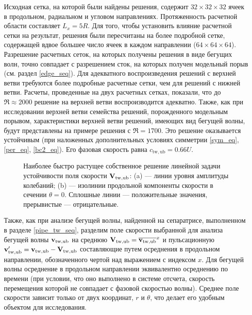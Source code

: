 Исходная сетка, на которой были найдены решения, содержит $32 \times 32 \times 32$ ячеек в продольном, радиальном и угловом направлениях. Протяженность расчетной области составляет $L_x = 5R$. Для того, чтобы установить влияние расчетной сетки на результат, решения были пересчитаны на более подробной сетке, содержащей вдвое большее число ячеек в каждом направлении ($64 \times 64 \times 64$). Разрешение расчетных сеток, на которых получены решения в виде бегущих волн, точно совпадает с разрешением сток, на которых получен модельный порыв (см. раздел \ref{edge_seq}). Для адекватного воспроизведения решений с верхней ветви требуются более подробные расчетные сетки, чем для решений с нижней ветви. Расчеты, проведенные на двух расчетных сетках, показали, что до $\Re \approx 2000$ решение на верхней ветви воспроизводится адекватно. Также, как при исследовании верхней ветви семейства решений, порожденного модельным порывом, характеристики верхней ветви решений, имеющих вид бегущей волны, будут представлены на примере решения с $\Re = 1700$. Это решение оказывается устойчивым (при наложенных дополнительных условиях симметрии \eqref{sym_eq}, \eqref{per_eq}, \eqref{bc2_eq}). Его фазовая скорость равна $c_\mathrm{tw,ub} = 0.66U$. 

\begin{figure}
\caption{Наиболее быстро растущее собственное решение линейной задачи устойчивости поля скорости $\mathbf{V}_\mathrm{tw,ub}$: (a) --- линии уровня амплитуды колебаний; (b) --- изолинии продольной компоненты скорости в сечении $\theta = 0$. Сплошные линии --- положительные значения, прерывистые --- отрицательные.}
\label{pipeTWub_lin_pic}
\end{figure}

Также, как при анализе бегущей волны, найденной на сепаратрисе, выполненном в разделе \ref{pipe_tw_seq}, разделим поле скорости выбранной для анализа бегущей волны $\mathbf{v}_\mathrm{tw,ub}$ на среднюю $\mathbf{V}_\mathrm{tw,ub} = \overline{\mathbf{v}_\mathrm{tw,ub}}^x$ и пульсационную $\mathbf{v}'_\mathrm{tw,ub} = \mathbf{v}_\mathrm{tw,ub} - \mathbf{V}_\mathrm{tw,ub}$ составляющие путем осреднения в продольном направлении, обозначенного чертой над выражением с индексом $x$.  Для бегущей волны осреднение в продольном направлении эквивалентно осреднению по времени (при условии, что оно выполнено в системе отсчета, скорость перемещения которой не совпадает с фазовой скоростью волны). Среднее поле скорости зависит только от двух координат, $r$ и $\theta$, что делает его удобным объектом для исследования. 

